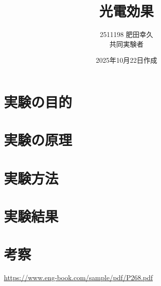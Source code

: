 \documentclass{jarticle}
\title{光電効果}
\author{2511198 肥田幸久 \\ 共同実験者 \\ }
\date{2025年10月22日作成}
\begin{document}
\maketitle



\section{実験の目的}



\section{実験の原理}



\section{実験方法}



\section{実験結果}



\section{考察}



\begin{thebibliography}{99}

   \url{https://www.eng-book.com/sample/pdf/P268.pdf}

\end{thebibliography}
\end{document}
